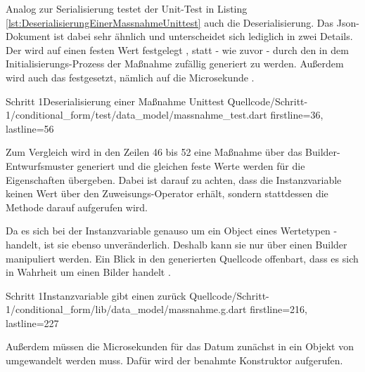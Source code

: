 Analog zur Serialisierung testet der Unit-Test in Listing \ref{lst:DeserialisierungEinerMassnahmeUnittest} auch die Deserialisierung. Das Json-Dokument ist dabei sehr ähnlich und unterscheidet sich lediglich in zwei Details. Der  wird auf einen festen Wert festgelegt , statt - wie zuvor - durch den in dem Initialisierungs-Prozess der Maßnahme zufällig generiert zu werden. Außerdem wird auch das  festgesetzt, nämlich auf die Microsekunde  . 

\begin{alexlisting}{Schritt 1}{Deserialisierung einer Maßnahme Unittest}
  {Quellcode/Schritt-1/conditional_form/test/data_model/massnahme_test.dart}
  {firstline=36, lastline=56}
  \label{lst:DeserialisierungEinerMassnahmeUnittest}
\end{alexlisting}


Zum Vergleich wird in den Zeilen 46 bis 52 eine Maßnahme über das Builder-Entwurfsmuster generiert und die gleichen feste Werte werden für die Eigenschaften übergeben. 
Dabei ist darauf zu achten, dass die Instanzvariable  keinen Wert über den Zuweisungs-Operator \IC{=} erhält, sondern stattdessen die Methode  darauf aufgerufen wird.

Da es sich bei der Instanzvariable  genauso um ein Object eines Wertetypen - handelt, ist sie ebenso unveränderlich. Deshalb kann sie nur über einen Builder manipuliert werden. Ein Blick in den generierten Quellcode offenbart, dass es sich in Wahrheit um einen Bilder handelt .

\begin{alexlisting}{Schritt 1}{Instanzvariable  gibt einen  zurück}
  {Quellcode/Schritt-1/conditional_form/lib/data_model/massnahme.g.dart}
  {firstline=216, lastline=227} 
  \label{lst:Schritt1InstanzvariableLetzteBearbeitungGibtEinenLetzteBearbeitungBuilderZurueck}
\end{alexlisting}

Außerdem müssen die Microsekunden für das Datum zunächst in ein Objekt von  umgewandelt werden muss. Dafür wird der benahmte Konstruktor    aufgerufen.

